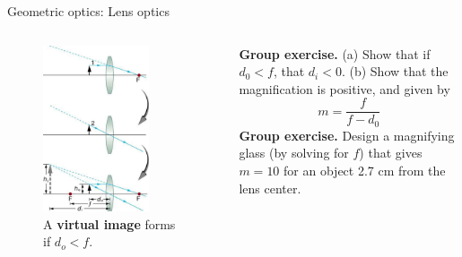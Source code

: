 \documentclass{beamer}
\begin{document}
\begin{frame}{Geometric optics: Lens optics}
\begin{columns}[T]
\begin{column}{0.5\textwidth}
\begin{figure}
\centering
\includegraphics[width=0.75\textwidth]{figures/virtual.png}
\caption{\label{fig:lens4} \footnotesize A \textbf{virtual image} forms if $d_o < f$.}
\end{figure}
\end{column}
\begin{column}{0.5\textwidth}
\textbf{Group exercise.} (a) Show that if $d_0 < f$, that $d_i < 0$.  (b) Show that the magnification is positive, and given by
\begin{equation}
m = \frac{f}{f-d_0}
\end{equation}
\textbf{Group exercise.} Design a magnifying glass (by solving for $f$) that gives $m = 10$ for an object 2.7 cm from the lens center.
\end{column}
\end{columns}
\end{frame}
\end{document}
